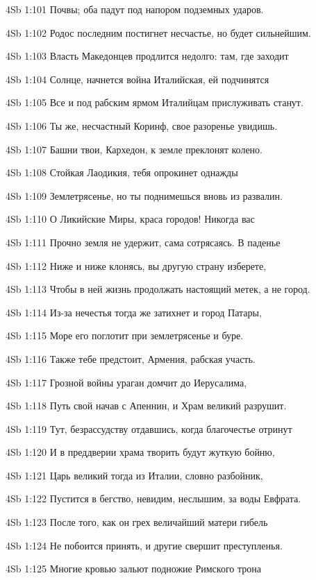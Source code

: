 \vs 4Sb 1:101 Почвы; оба падут под напором подземных ударов. 

\vs 4Sb 1:102 Родос последним постигнет несчастье, но будет сильнейшим.

\vs 4Sb 1:103 Власть Македонцев продлится недолго: там, где заходит 

\vs 4Sb 1:104 Солнце, начнется война Италийская, ей подчинятся 

\vs 4Sb 1:105 Все и под рабским ярмом Италийцам прислуживать станут. 

\vs 4Sb 1:106 Ты же, несчастный Коринф, свое разоренье увидишь. 

\vs 4Sb 1:107 Башни твои, Кархедон, к земле преклонят колено.

\vs 4Sb 1:108 Стойкая Лаодикия, тебя опрокинет однажды 

\vs 4Sb 1:109 Землетрясенье, но ты поднимешься вновь из развалин. 

\vs 4Sb 1:110 О Ликийские Миры, краса городов! Никогда вас 

\vs 4Sb 1:111 Прочно земля не удержит, сама сотрясаясь. В паденье 

\vs 4Sb 1:112 Ниже и ниже клонясь, вы другую страну изберете, 

\vs 4Sb 1:113 Чтобы в ней жизнь продолжать  настоящий метек, а не город.

\vs 4Sb 1:114 Из-за нечестья тогда же затихнет и город Патары, 

\vs 4Sb 1:115 Море его поглотит при землетрясенье и буре.

\vs 4Sb 1:116 Также тебе предстоит, Армения, рабская участь.

\vs 4Sb 1:117 Грозной войны ураган домчит до Иерусалима,

\vs 4Sb 1:118 Путь свой начав с Апеннин, и Храм великий разрушит. 

\vs 4Sb 1:119 Тут, безрассудству отдавшись, когда благочестье отринут 

\vs 4Sb 1:120 И в преддверии храма творить будут жуткую бойню,  

\vs 4Sb 1:121 Царь великий тогда из Италии, словно разбойник,

\vs 4Sb 1:122 Пустится в бегство, невидим, неслышим, за воды Евфрата. 

\vs 4Sb 1:123 После того, как он грех величайший  матери гибель  

\vs 4Sb 1:124 Не побоится принять, и другие свершит преступленья. 

\vs 4Sb 1:125 Многие кровью зальют подножие Римского трона 


